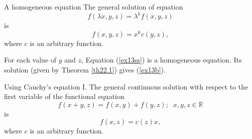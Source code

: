\documentclass[
	11pt, %
	fleqn, %
	a4paper, %
]{LegrandOrangeBook}
\newcommand{\R}{\mathbb{R}}
\begin{document}
\begin{example}{A homogeneous equation}
The general solution of equation
\begin{equation}\label{ex13ss}
f(\lambda x,y,z)=\lambda^k f(x,y,z)
\end{equation}
is
\begin{equation}\label{ex13b}
f(x,y,z)=x^k c(y,z),
\end{equation}
where $c$ is an arbitrary function.

 For each value of $y$ and $z$, Equation
(\ref{ex13ss}) is a homogeneous equation. Its solution (given by
Theorem \ref{th22.1}) gives (\ref{ex13b}).
\end{example}


\begin{example}{Using Cauchy's equation I. }\label{cau1-ej}
The general continuous solution with respect to the first variable of the functional equation
\begin{equation}\label{cau1-e1}
f(x+y,z)=f(x,y)+f(y,z);\;\;x,y,z \in \R
\end{equation}
is
\begin{equation}\label{cau1-e2}
f(x,z)=c(z) x,
\end{equation}
where $c$ is an arbitrary function.
\end{example}
\end{document}
